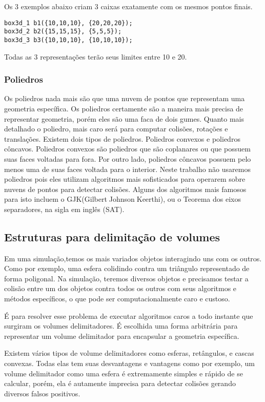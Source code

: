 Os 3 exemplos abaixo criam 3 caixas exatamente com os mesmos pontos finais.

\begin{lstlisting}[frame=single,caption=Código de exemplo\label{codigo1}]
box3d_1 b1({10,10,10}, {20,20,20});
box3d_2 b2({15,15,15}, {5,5,5});
box3d_3 b3({10,10,10}, {10,10,10});
\end{lstlisting}

Todas as 3 representações terão seus limites entre 10 e 20.


\subsubsection{Poliedros}

Os poliedros nada mais são que uma nuvem de pontos que representam uma
geometria específica. Os poliedros certamente são a maneira mais precisa de
representar geometria, porém eles são uma faca de dois gumes. Quanto mais
detalhado o poliedro, mais caro será para computar colisões, rotações e
translações. Existem dois tipos de poliedros. Poliedros convexos e poliedros
côncavos. Poliedros convexos são poliedros que são coplanares ou que possuem
suas faces voltadas para fora. Por outro lado, poliedros côncavos possuem
pelo menos uma de suas faces voltada para o interior.
Neste trabalho não usaremos poliedros pois eles utilizam algoritmos mais
sofisticados para operarem sobre nuvens de pontos para detectar colisões.
Alguns dos algoritmos mais famosos para isto incluem o
GJK(GilbertJohnsonKeerthi), ou o Teorema dos eixos separadores, na sigla em
inglês (SAT).

\subsection{ Estruturas para delimitação de volumes}
Em uma simulação,temos os mais variados objetos interagindo uns com os outros.
Como por exemplo, uma esfera colidindo contra um triângulo representado de
forma poligonal. Na simulação, teremos diversos objetos e precisamos testar a
colisão entre um dos objetos contra todos os outros com seus algoritmos e
métodos específicos, o que pode ser computacionalmente caro e custoso.

É para resolver esse problema de executar algoritmos caros a todo instante que
surgiram os volumes delimitadores. É escolhida uma forma arbitrária para
representar um volume delimitador para encapsular a geometria específica.

Existem vários tipos de volume delimitadores como esferas, retângulos, e cascas
convexas. Todas elas tem suas desvantagens e vantagens como por exemplo, um
volume delimitador como uma esfera é extremamente simples e rápido de se
calcular, porém, ela é autamente imprecisa para detectar colisões gerando
diversos falsos positivos.

